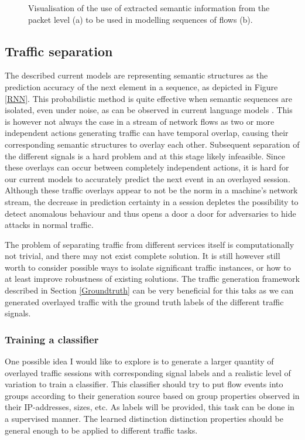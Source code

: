 \documentclass[a4paper,12pt,twoside]{report}
\begin{document}
\begin{figure}
\begin{subfigure}[b]{0.45\textwidth}
\caption{}\label{Lat1}
\end{subfigure}
\caption{Visualisation of the use of extracted semantic information from the packet level (a) to be used in modelling sequences of flows (b).}
\end{figure}

\subsection{Traffic separation}\label{Sep}



The described current models are representing semantic structures as the prediction accuracy of the next element in a sequence, as depicted in Figure \ref{RNN}. This probabilistic method is quite effective when semantic sequences are isolated, even under noise, as can be observed in current language models \cite{shi2012towards}. This is however not always the case in a stream of network flows as two or more independent actions generating traffic can have temporal overlap, causing their corresponding semantic structures to overlay each other. Subsequent separation of the different signals is a hard problem and at this stage likely infeasible. Since these overlays can occur between completely independent actions, it is hard for our current models to accurately predict the next event in an overlayed session. Although these traffic overlays appear to not be the norm in a machine's network stream, the decrease in prediction certainty in a session depletes the possibility to detect anomalous behaviour and thus opens a door a door for adversaries to hide attacks in normal traffic. 


The problem of separating traffic from different services itself is computationally not trivial, and there may not exist complete solution. It is still however still worth to consider possible ways to isolate significant traffic instances, or how to at least improve robustness of existing solutions. The traffic generation framework described in Section \ref{Groundtruth} can be very beneficial for this taks as we can generated overlayed traffic with the ground truth labels of the different traffic signals. 

\subsubsection{Training a classifier}

One possible idea I would like to explore is to generate a larger quantity of overlayed traffic sessions with corresponding signal labels and a realistic level of variation to train a classifier. This classifier should try to put flow events into groups according to their generation source based on group properties observed in their IP-addresses, sizes, etc. As labels will be provided, this task can be done in a supervised manner. The learned distinction distinction properties should be general enough to be applied to different traffic tasks. 
\end{document}
